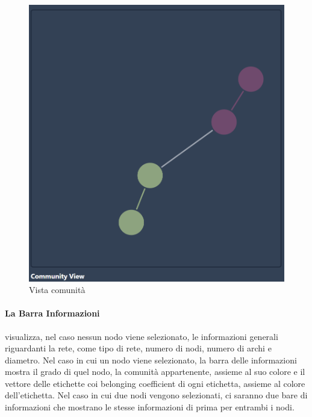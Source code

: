 \documentclass[a4paper,12pt]{report}
\begin{document}
			\begin{center}
			\begin{figure}[H]
			\centering
			\includegraphics[width=0.9\linewidth,keepaspectratio]{comview}
			\caption{Vista comunità}
			\end{figure}
			\end{center}			

			\paragraph*{La Barra Informazioni} visualizza, nel caso nessun nodo viene selezionato, le informazioni generali riguardanti la rete, come tipo di rete, numero di nodi, numero di archi e diametro. Nel caso in cui un nodo viene selezionato, la barra delle informazioni mostra il grado di quel nodo, la comunità appartenente, assieme al suo colore e il vettore delle etichette coi belonging coefficient di ogni etichetta, assieme al colore dell'etichetta. Nel caso in cui due nodi vengono selezionati, ci saranno due bare di informazioni che mostrano le stesse informazioni di prima per entrambi i nodi. 
\end{document}
